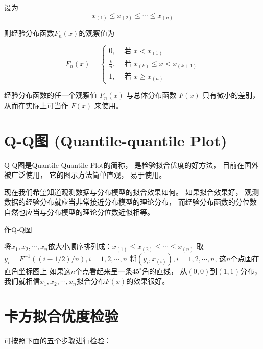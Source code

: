 设为
\begin{equation}
x_{(1)} \leq x_{(2)} \leq \cdots \leq x_{(n)}
\end{equation}

则经验分布函数$F_{n}(x)$的观察值为

\begin{equation}
F_{n}(x)=\left\{\begin{array}{ll}
0, & \text { 若 } x<x_{(1)} \\
\frac{k}{n}, & \text { 若 } x_{(k)} \leq x<x_{(k+1)} \\
1, & \text { 若 } x \geq x_{(n)}
\end{array}\right.
\end{equation}

经验分布函数的任一个观察值 $F_n(x)$ 与总体分布函数 $F(x)$ 只有微小的差别， 从而在实际上可当作 $F(x)$ 来使用。 

\section{Q-Q图 (Quantile-quantile Plot)}

Q-Q图是Quantile-Quantile Plot的简称， 是检验拟合优度的好方法， 目前在国外被广泛使用， 它的图示方法简单直观， 易于使用。 

现在我们希望知道观测数据与分布模型的拟合效果如何。 如果拟合效果好， 观测数据的经验分布就应当非常接近分布模型的理论分布， 而经验分布函数的分位数自然也应当与分布模型的理论分位数近似相等。 

\begin{algorithm}
    \caption{作Q-Q图}
    
将$x_1,x_2,\cdots,x_n$依大小顺序排列成：$x_{(1)}\le x_{(2)}\le\cdots\le x_{(n)}$\;
取$y_i=F^{-1}((i-1/2)/n), i=1,2,\cdots,n$\;
将$(y_i,x_{(i)}), i=1,2,\cdots,n$, 这$n$个点画在直角坐标图上\;
如果这$n$个点看起来呈一条$45^\circ$角的直线， 从$(0,0)$到$(1,1)$分布， 我们就相信$x_1,x_2,\cdots,x_n$拟合分布$F(x)$的效果很好。 
\end{algorithm}

\section{卡方拟合优度检验}

可按照下面的五个步骤进行检验：

